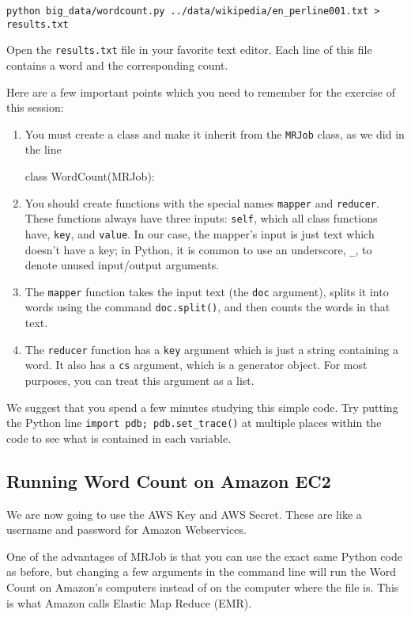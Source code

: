 \begin{verbatim}
python big_data/wordcount.py ../data/wikipedia/en_perline001.txt > results.txt
\end{verbatim}

Open the \texttt{results.txt} file in your favorite text editor. Each line of this file contains a word and the corresponding count.

Here are a few important points which you need to remember for the exercise of this session:
%
\begin{enumerate}
	\item You must create a class and make it inherit from the \texttt{MRJob} class, as we did in the line 	
\begin{python}
	class WordCount(MRJob):
\end{python}
	\item You should create functions with the special names \texttt{mapper} and \texttt{reducer}. These functions always have three inputs: \texttt{self}, which all class functions have, \texttt{key}, and \texttt{value}. In our case, the mapper's input is just text which doesn't have a key; in Python, it is common to use an underscore, \texttt{\_}, to denote unused input/output arguments.
	\item The \texttt{mapper} function takes the input text (the \texttt{doc} argument), splits it into words using the command \texttt{doc.split()}, and then counts the words in that text.
	\item The \texttt{reducer} function has a \texttt{key} argument which is just a string containing a word. It also has a \texttt{cs} argument, which is a generator object. For most purposes, you can treat this argument as a list.
\end{enumerate}

We suggest that you spend a few minutes studying this simple code. Try putting the Python line \texttt{import pdb; pdb.set\_trace()} at multiple places within the code to see what is contained in each variable.

\subsection{Running Word Count on Amazon EC2}

We are now going to use the AWS Key and AWS Secret. These are like a username and password for Amazon Webservices.

One of the advantages of MRJob is that you can use the exact same Python code as before, but changing a few arguments in the command line will run the Word Count on Amazon's computers instead of on the computer where the file is. This is what Amazon calls Elastic Map Reduce (EMR).

